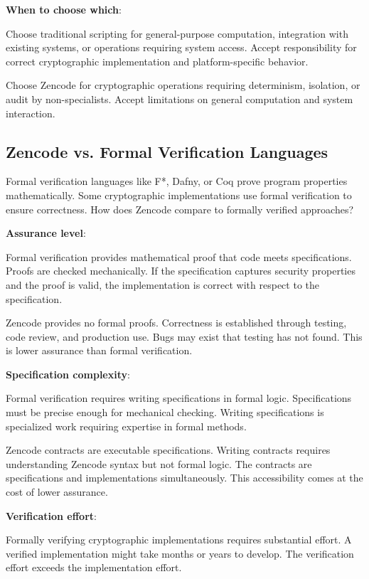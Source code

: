 \textbf{When to choose which}:

Choose traditional scripting for general-purpose computation,
integration with existing systems, or operations requiring system
access. Accept responsibility for correct cryptographic implementation
and platform-specific behavior.

Choose Zencode for cryptographic operations requiring determinism,
isolation, or audit by non-specialists. Accept limitations on general
computation and system interaction.

\subsection{Zencode vs. Formal Verification Languages}

Formal verification languages like F*, Dafny, or Coq prove program
properties mathematically. Some cryptographic implementations use
formal verification to ensure correctness. How does Zencode compare to
formally verified approaches?

\textbf{Assurance level}:

Formal verification provides mathematical proof that code meets
specifications. Proofs are checked mechanically. If the specification
captures security properties and the proof is valid, the
implementation is correct with respect to the specification.

Zencode provides no formal proofs. Correctness is established through
testing, code review, and production use. Bugs may exist that testing
has not found. This is lower assurance than formal verification.

\textbf{Specification complexity}:

Formal verification requires writing specifications in formal
logic. Specifications must be precise enough for mechanical
checking. Writing specifications is specialized work requiring
expertise in formal methods.

Zencode contracts are executable specifications. Writing contracts
requires understanding Zencode syntax but not formal logic. The
contracts are specifications and implementations simultaneously. This
accessibility comes at the cost of lower assurance.

\textbf{Verification effort}:

Formally verifying cryptographic implementations requires substantial
effort. A verified implementation might take months or years to
develop. The verification effort exceeds the implementation effort.

